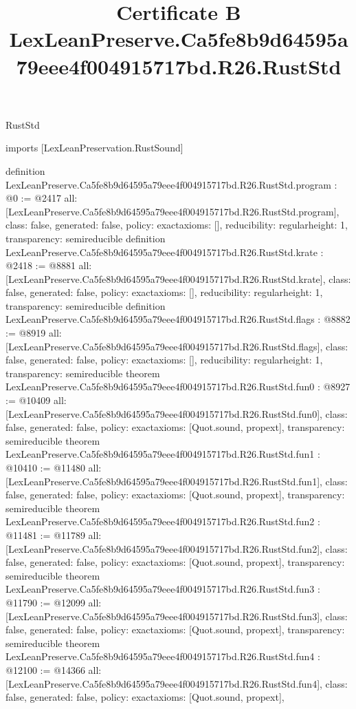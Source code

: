 \begin{lexlean}{RustStd}
\title{Certificate B LexLeanPreserve.Ca5fe8b9d64595a79eee4f004915717bd.R26.RustStd}
\begin{coremodule}
imports [LexLeanPreservation.RustSound]

definition LexLeanPreserve.Ca5fe8b9d64595a79eee4f004915717bd.R26.RustStd.program : @0 := @2417 {
  all: [LexLeanPreserve.Ca5fe8b9d64595a79eee4f004915717bd.R26.RustStd.program],
  class: false,
  generated: false,
  policy: exact{axioms: []},
  reducibility: regular{height: 1},
  transparency: semireducible
}
definition LexLeanPreserve.Ca5fe8b9d64595a79eee4f004915717bd.R26.RustStd.krate : @2418 := @8881 {
  all: [LexLeanPreserve.Ca5fe8b9d64595a79eee4f004915717bd.R26.RustStd.krate],
  class: false,
  generated: false,
  policy: exact{axioms: []},
  reducibility: regular{height: 1},
  transparency: semireducible
}
definition LexLeanPreserve.Ca5fe8b9d64595a79eee4f004915717bd.R26.RustStd.flags : @8882 := @8919 {
  all: [LexLeanPreserve.Ca5fe8b9d64595a79eee4f004915717bd.R26.RustStd.flags],
  class: false,
  generated: false,
  policy: exact{axioms: []},
  reducibility: regular{height: 1},
  transparency: semireducible
}
theorem LexLeanPreserve.Ca5fe8b9d64595a79eee4f004915717bd.R26.RustStd.fun0 : @8927 := @10409 {
  all: [LexLeanPreserve.Ca5fe8b9d64595a79eee4f004915717bd.R26.RustStd.fun0],
  class: false,
  generated: false,
  policy: exact{axioms: [Quot.sound, propext]},
  transparency: semireducible
}
theorem LexLeanPreserve.Ca5fe8b9d64595a79eee4f004915717bd.R26.RustStd.fun1 : @10410 := @11480 {
  all: [LexLeanPreserve.Ca5fe8b9d64595a79eee4f004915717bd.R26.RustStd.fun1],
  class: false,
  generated: false,
  policy: exact{axioms: [Quot.sound, propext]},
  transparency: semireducible
}
theorem LexLeanPreserve.Ca5fe8b9d64595a79eee4f004915717bd.R26.RustStd.fun2 : @11481 := @11789 {
  all: [LexLeanPreserve.Ca5fe8b9d64595a79eee4f004915717bd.R26.RustStd.fun2],
  class: false,
  generated: false,
  policy: exact{axioms: [Quot.sound, propext]},
  transparency: semireducible
}
theorem LexLeanPreserve.Ca5fe8b9d64595a79eee4f004915717bd.R26.RustStd.fun3 : @11790 := @12099 {
  all: [LexLeanPreserve.Ca5fe8b9d64595a79eee4f004915717bd.R26.RustStd.fun3],
  class: false,
  generated: false,
  policy: exact{axioms: [Quot.sound, propext]},
  transparency: semireducible
}
theorem LexLeanPreserve.Ca5fe8b9d64595a79eee4f004915717bd.R26.RustStd.fun4 : @12100 := @14366 {
  all: [LexLeanPreserve.Ca5fe8b9d64595a79eee4f004915717bd.R26.RustStd.fun4],
  class: false,
  generated: false,
  policy: exact{axioms: [Quot.sound, propext]},
}
\end{coremodule}
\end{lexlean}
